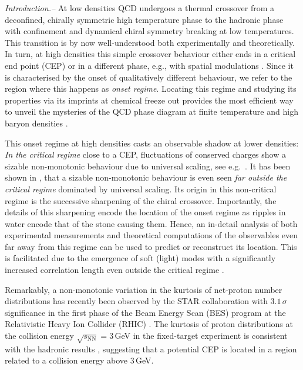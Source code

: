 \documentclass[reprint,twocolumn,superscriptaddress,preprintnumbers,amsmath,amssymb,aps,prd,floatfix]{revtex4-2}
\begin{document}
\emph{Introduction.--} 
%
At low densities QCD undergoes a thermal crossover from a deconfined, chirally symmetric high temperature phase to the hadronic phase with confinement and dynamical chiral symmetry breaking at low temperatures. This transition is by now well-understood both experimentally and theoretically. In turn, at high densities this simple crossover behaviour either ends in a critical end point (CEP) or in a different phase, e.g., with spatial modulations \cite{Fukushima:2010bq, Fu:2019hdw, Pisarski:2021qof, Rennecke:2023xhc}. Since it is characterised by the onset of qualitatively different behaviour, we refer to the region where this happens as \emph{onset regime}. Locating this regime and studying its properties via its imprints at chemical freeze out provides the most efficient way to unveil the mysteries of the QCD phase diagram at finite temperature and high baryon densities \cite{Arslandok:2023utm, Luo:2022mtp}.

This onset regime at high densities casts an observable shadow at lower densities: \textit{In the critical regime} close to a CEP, fluctuations of conserved charges show a sizable non-monotonic behaviour due to universal scaling, see e.g.~\cite{Stephanov:1999zu, Stephanov:2008qz, Luo:2017faz, STAR:2020tga, STAR:2021iop, Mroczek:2020rpm, Dore:2022qyz}. It has been shown in \cite{Fu:2021oaw}, that a sizable non-monotonic behaviour is even seen \textit{far outside the critical regime} dominated by  universal scaling. Its origin in this non-critical regime is the successive sharpening of the chiral crossover. Importantly, the details of this sharpening encode the location of the onset regime as ripples in water encode that of the stone causing them. Hence, an in-detail analysis of both experimental measurements and theoretical computations of the observables even far away from this regime can be used to predict or reconstruct its location. This is facilitated due to the emergence of soft (light) modes with a significantly increased correlation length even outside the critical regime \cite{MagEoS:2023}. 

Remarkably, a non-monotonic variation in the kurtosis of net-proton number distributions has recently been observed by the STAR collaboration with $3.1\,\sigma$ significance in the first phase of the Beam Energy Scan (BES) program at the Relativistic Heavy Ion Collider (RHIC) \cite{STAR:2020tga}. The kurtosis of proton distributions at the collision energy $\sqrt{s_{\mathrm{NN}}}=$3\,GeV in the fixed-target experiment is consistent with the hadronic results \cite{STAR:2021fge, STAR:2022etb}, suggesting that a potential CEP is located in a region related to a collision energy above 3\,GeV. 
\end{document}
